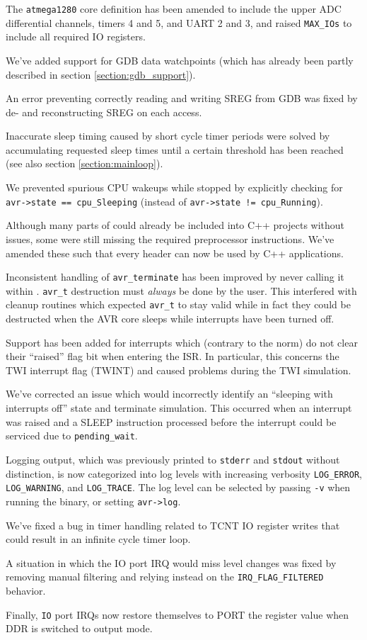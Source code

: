 The \verb|atmega1280| core definition has been amended to include the upper \ac{ADC}
differential channels, timers 4 and 5, and \ac{UART} 2 and 3, and raised
\lstinline|MAX_IOs| to include all required \ac{IO} registers.

We've added support for \ac{GDB} data watchpoints (which has already been
partly described in section \ref{section:gdb_support}).

An error preventing correctly reading and writing \ac{SREG} from \ac{GDB} was fixed
by de- and reconstructing \ac{SREG} on each access.

Inaccurate sleep timing caused by short cycle timer periods were solved by
accumulating requested sleep times until a certain threshold has been reached
(see also section \ref{section:mainloop}).

We prevented spurious \ac{CPU} wakeups while stopped by explicitly checking for
\lstinline|avr->state == cpu_Sleeping|
(instead of \lstinline|avr->state != cpu_Running|).

Although many parts of \simavr could already be included into C++ projects
without issues, some were still missing the required preprocessor instructions.
We've amended these such that every header can now be used by C++ applications.

Inconsistent handling of \lstinline|avr_terminate| has been improved by never
calling it within \simavr. \lstinline|avr_t| destruction must \emph{always}
be done by the user. This interfered with cleanup routines which expected
\lstinline|avr_t| to stay valid while in fact they could be destructed when
the \ac{AVR} core sleeps while interrupts have been turned off.

Support has been added for interrupts which (contrary to the norm) do not clear
their ``raised'' flag bit when entering the \ac{ISR}. In particular, this
concerns the \ac{TWI} interrupt flag (TWINT) and caused problems during the
\ac{TWI} simulation.

We've corrected an issue which would incorrectly identify an ``sleeping with
interrupts off'' state and terminate simulation. This occurred when an interrupt
was raised and a SLEEP instruction processed before the interrupt could be
serviced due to \lstinline|pending_wait|.

Logging output, which was previously printed to \lstinline|stderr| and
\lstinline|stdout| without distinction, is now categorized into log levels with
increasing verbosity \lstinline|LOG_ERROR|, \lstinline|LOG_WARNING|, and
\lstinline|LOG_TRACE|. The log level can be selected by passing \verb|-v|
when running the \simavr binary, or setting \lstinline|avr->log|.

We've fixed a bug in timer handling related to TCNT \ac{IO} register writes that could
result in an infinite cycle timer loop.

A situation in which the \ac{IO} port \ac{IRQ} would miss level changes was fixed by
removing manual filtering and relying instead on the \lstinline|IRQ_FLAG_FILTERED|
behavior.

Finally, \lstinline|IO| port \acp{IRQ} now restore themselves to PORT
the register value when \ac{DDR} is switched to output mode.
